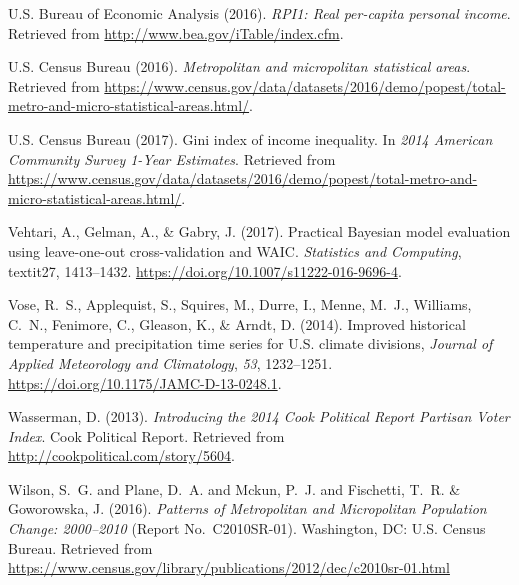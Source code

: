 \documentclass[draft,linenumbers]{agujournal}
\begin{document}
\begin{thebibliography}{33}
  U.S. Bureau of Economic Analysis (2016{}).
  \textit{{RPI1}: Real per-capita personal income}.
  Retrieved from
  \url{http://www.bea.gov/iTable/index.cfm}.

  U.S. Census Bureau (2016).
  \textit{Metropolitan and micropolitan statistical areas}.
  Retrieved from
  \url{https://www.census.gov/data/datasets/2016/demo/popest/total-metro-and-micro-statistical-areas.html/}.

  {U.S. Census Bureau} (2017).
  Gini index of income inequality.
  In \textit{2014 American Community Survey 1-Year Estimates}.
  Retrieved from
  \url{https://www.census.gov/data/datasets/2016/demo/popest/total-metro-and-micro-statistical-areas.html/}.

  Vehtari, A., Gelman, A., \& Gabry, J. (2017).
  Practical {Bayesian} model evaluation using leave-one-out cross-validation and {WAIC}.
  \textit{Statistics and Computing}, textit{27}, 1413--1432.
  \url{https://doi.org/10.1007/s11222-016-9696-4}.

  Vose, R.~S., Applequist, S., Squires, M., Durre, I., Menne, M.~J., Williams, C.~N.,
  Fenimore, C., Gleason, K., \& Arndt, D. (2014).
  Improved historical temperature and precipitation time series for {U}.{S}.
  climate divisions,
  \textit{Journal of  Applied Meteorology and Climatology}, \textit{53}, 1232--1251.
  \url{https://doi.org/10.1175/JAMC-D-13-0248.1}.

  Wasserman, D. (2013).
  \textit{Introducing the 2014 {C}ook {P}olitical {R}eport {P}artisan {V}oter
  {I}ndex}.
  Cook Political Report.
  Retrieved from
  \url{http://cookpolitical.com/story/5604}.

  Wilson, S.~G. and Plane, D.~A. and Mckun, P.~J. and Fischetti, T.~R. \&
  Goworowska, J. (2016).
  \textit{Patterns of Metropolitan and Micropolitan Population Change: 2000--2010\/}
  (Report No.~C2010SR-01).
  Washington, DC:  U.S. Census Bureau.
  Retrieved from
  \url{https://www.census.gov/library/publications/2012/dec/c2010sr-01.html}

\end{thebibliography}
\end{document}
